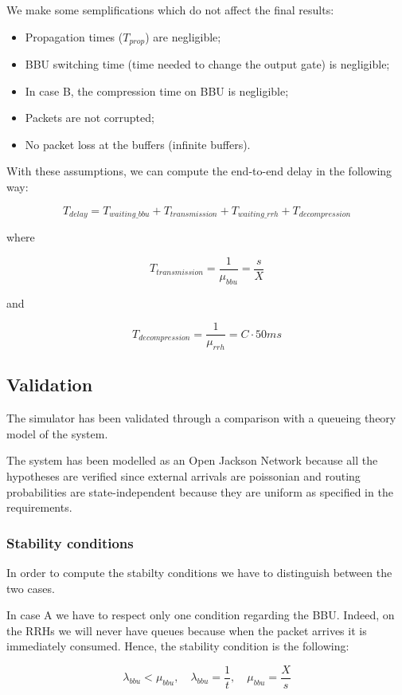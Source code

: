 \documentclass[11pt,a4paper,oneside, openright]{article}
\begin{document}
We make some semplifications which do not affect the final results:
\begin{itemize}
    \item Propagation times ($ T_{prop} $) are negligible;
    \item BBU switching time (time needed to change the output gate) is negligible;
    \item In case B, the compression time on BBU is negligible;
    \item Packets are not corrupted;
    \item No packet loss at the buffers (infinite buffers).
\end{itemize}

With these assumptions, we can compute the end-to-end delay in the following way:

$$ T_{delay} =  T_{waiting\_bbu} + T_{transmission} + T_{waiting\_rrh} + T_{decompression} $$

where 

$$ T_{transmission} = \frac{1}{\mu_{bbu}} = \frac{s}{X} $$

and

$$ T_{decompression} = \frac{1}{\mu_{rrh}} = C \cdot 50ms $$

\subsection{Validation}
The simulator has been validated through a comparison with a queueing theory model of the system.

The system has been modelled as an Open Jackson Network because all the hypotheses are verified since external arrivals are poissonian and routing probabilities are state-independent because they are uniform as specified in the requirements.

\subsubsection{Stability conditions}
In order to compute the stabilty conditions we have to distinguish between the two cases.

In case A we have to respect only one condition regarding the BBU. Indeed, on the RRHs we will never have queues because when the packet arrives it is immediately consumed.
Hence, the stability condition is the following:

$$ \lambda_{bbu} < \mu_{bbu}, \quad \lambda_{bbu} = \frac{1}{t}, \quad \mu_{bbu} = \frac{X}{s}$$
\end{document}
